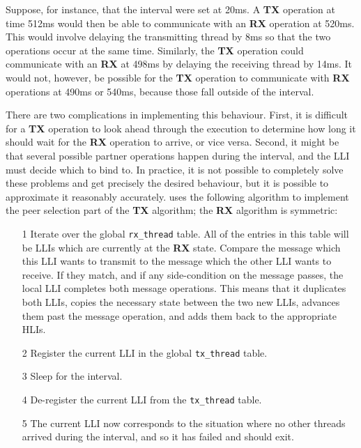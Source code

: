 Suppose, for instance, that the interval were set at 20ms.  A
\textbf{TX} operation at time 512ms would then be able to communicate
with an \textbf{RX} operation at 520ms.  This would involve delaying
the transmitting thread by 8ms so that the two operations occur at the
same time.  Similarly, the \textbf{TX} operation could communicate
with an \textbf{RX} at 498ms by delaying the receiving thread by 14ms.
It would not, however, be possible for the \textbf{TX} operation to
communicate with \textbf{RX} operations at 490ms or 540ms, because
those fall outside of the interval.

There are two complications in implementing this behaviour.  First, it
is difficult for a \textbf{TX} operation to look ahead through the
execution to determine how long it should wait for the \textbf{RX}
operation to arrive, or vice versa.  Second, it might be that several
possible partner operations happen during the interval, and the LLI
must decide which to bind to.  In practice, it is not possible to
completely solve these problems and get precisely the desired
behaviour, but it is possible to approximate it reasonably accurately.
{\Implementation} uses the following algorithm to implement the peer
selection part of the \textbf{TX} algorithm; the \textbf{RX} algorithm
is symmetric:

\begin{itemize}
\item[1] Iterate over the global \texttt{rx\_thread} table.  All of
  the entries in this table will be LLIs which are currently at the
  \textbf{RX} state.  Compare the message which this LLI wants to
  transmit to the message which the other LLI wants to receive.  If
  they match, and if any side-condition on the message passes, the
  local LLI completes both message operations.  This means that it
  duplicates both LLIs, copies the necessary state between the two new
  LLIs, advances them past the message operation, and adds them back
  to the appropriate HLIs.
\item[2] Register the current LLI in the global \texttt{tx\_thread}
  table.
\item[3] Sleep for the interval.
\item[4] De-register the current LLI from the \texttt{tx\_thread}
  table.
\item[5] The current LLI now corresponds to the situation where no
  other threads arrived during the interval, and so it has failed and
  should exit.
\end{itemize}

